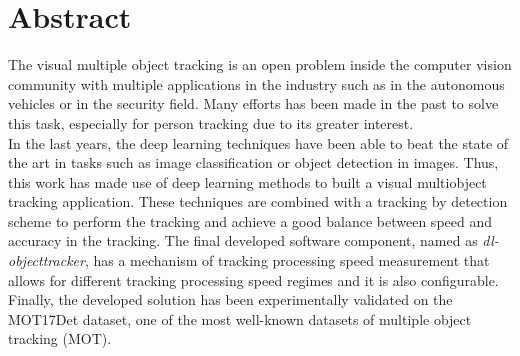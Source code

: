 \chapter*{Abstract}
The visual multiple object tracking is an open problem inside the computer vision community with multiple applications in the industry such as in the autonomous vehicles or in the security field. Many efforts has been made in the past to solve this task, especially for person tracking due to its greater interest.\\
In the last years, the deep learning techniques have been able to beat the state of the art in tasks such as image classification or object detection in images. Thus, this work has made use of deep learning methods to built a visual multiobject tracking application. These techniques are combined with a tracking by detection scheme to perform the tracking and achieve a good balance between speed and accuracy in the tracking. The final developed software component, named as \textit{dl-objecttracker}, has a mechanism of tracking processing speed measurement that allows for different tracking processing speed regimes and it is also configurable.\\
Finally, the developed solution has been experimentally validated on the MOT17Det dataset, one of the most well-known datasets of multiple object tracking (MOT).
